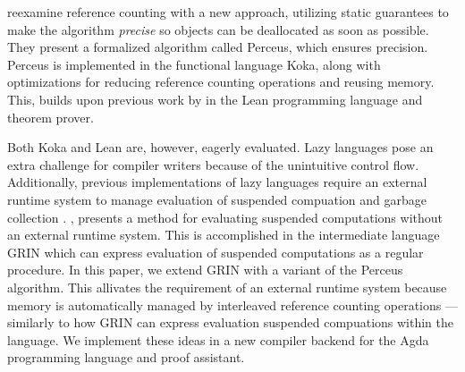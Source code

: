 \documentclass[9pt, twocolumn]{article}
\begin{document}
\citet{reinking2021} reexamine reference counting with a new approach, utilizing static guarantees to make the algorithm \emph{precise} so objects can be deallocated as soon as possible.
They present a formalized algorithm called Perceus, which ensures precision. 
Perceus is implemented in the functional language Koka, along with optimizations for reducing reference counting operations and reusing memory.
This, builds upon previous work by \citet{ullrich2021} in the Lean programming language and theorem prover. 


Both Koka and Lean are, however, eagerly evaluated. 
Lazy languages pose an extra challenge for compiler writers because of the unintuitive control flow. 
Additionally, previous implementations of lazy languages require an external runtime system to manage evaluation of suspended compuation and garbage collection \citep{johnsson1984, augustsson1984, jones1992, turner1979}.
\citet{johnsson1991}, presents a method for evaluating suspended computations without an external runtime system.
This is accomplished in the intermediate language GRIN which can express evaluation of suspended computations as a regular procedure.
In this paper, we extend GRIN with a variant of the Perceus algorithm.
This allivates the requirement of an external runtime system because memory is automatically managed by interleaved reference counting operations --- similarly  to how GRIN can express evaluation suspended compuations within the language. 
We implement these ideas in a new compiler backend for the Agda programming language and proof assistant. 


\end{document}
